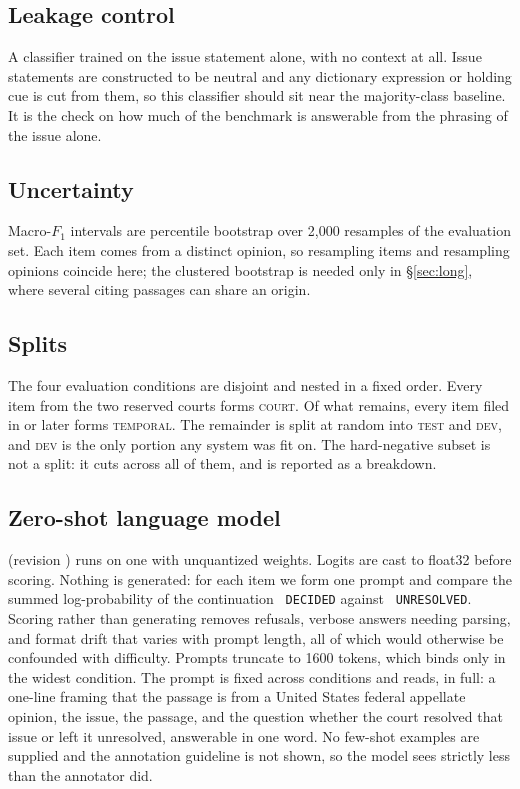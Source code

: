 \subsection{Leakage control} A classifier trained on the issue statement alone,
with no context at all. Issue statements are constructed to be neutral and any
dictionary expression or holding cue is cut from them, so this classifier should
sit near the majority-class baseline. It is the check on how much of the
benchmark is answerable from the phrasing of the issue alone.

\subsection{Uncertainty} Macro-$F_1$ intervals are percentile bootstrap over
2{,}000 resamples of the evaluation set. Each item comes from a distinct opinion,
so resampling items and resampling opinions coincide here; the clustered
bootstrap is needed only in \S\ref{sec:long}, where several citing passages can
share an origin.

\subsection{Splits} The four evaluation conditions are disjoint and nested in a
fixed order. Every item from the two reserved courts forms \textsc{court}. Of
what remains, every item filed in \TemporalCut{} or later forms
\textsc{temporal}. The remainder is split at random into \textsc{test} and
\textsc{dev}, and \textsc{dev} is the only portion any system was fit on. The
hard-negative subset is not a split: it cuts across all of them, and is reported
as a breakdown.



\subsection{Zero-shot language model}
\LLMName{} (revision \texttt{\LLMRevision}) runs on one \LLMDevice{} with
unquantized \LLMDtype{} weights. Logits are cast to float32 before scoring.
Nothing is generated: for each item we form one prompt and compare the summed
log-probability of the continuation
\texttt{ DECIDED} against \texttt{ UNRESOLVED}. Scoring rather than generating
removes refusals, verbose answers needing parsing, and format drift that varies
with prompt length, all of which would otherwise be confounded with difficulty.
Prompts truncate to 1600 tokens, which binds only in the widest condition. The
prompt is fixed across conditions and reads, in full: a one-line framing that the
passage is from a United States federal appellate opinion, the issue, the
passage, and the question whether the court resolved that issue or left it
unresolved, answerable in one word. No few-shot examples are supplied and the
annotation guideline is not shown, so the model sees strictly less than the
annotator did.



